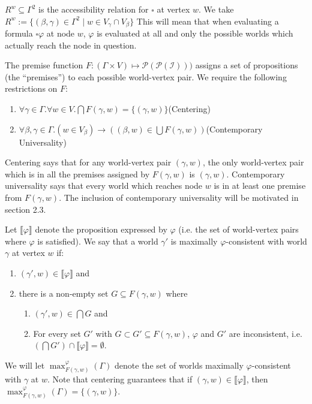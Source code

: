 \documentclass{article}
\begin{document}
$R^w\subseteq\Gamma^2$ is the accessibility relation for $\square$ at vertex $w$. We take $R^w :=\{(\beta,\gamma)\in\Gamma^2\mid w\in V_{\gamma}\cap V_{\beta}\}$ This will mean that when evaluating a formula $\square\varphi$ at node $w$, $\varphi$ is evaluated at all and only the possible worlds which actually reach the node in question.

The premise function $F:(\Gamma\times V)\longmapsto\mathcal P(\mathcal P(\mathcal I)))$ assigns a set of propositions (the ``premises'') to each possible world-vertex pair. We require the following restrictions on $F$:

\begin{enumerate}
    \item $\forall\gamma\in\Gamma.\forall w\in V.\bigcap F(\gamma,w)=\{(\gamma,w)\}$\quad(Centering)
    \item $\forall\beta,\gamma\in\Gamma.(w\in V_{\beta})\longrightarrow ((\beta,w)\in\bigcup F(\gamma,w))$\quad(Contemporary Universality)
\end{enumerate}
Centering says that for any world-vertex pair $(\gamma,w)$, the only world-vertex pair which is in all the premises assigned by $F(\gamma,w)$ is $(\gamma,w)$. Contemporary universality says that every world which reaches node $w$ is in at least one premise from $F(\gamma,w)$. The inclusion of contemporary universality will be motivated in section 2.3.

Let $\llbracket\varphi\rrbracket$ denote the proposition expressed by $\varphi$ (i.e. the set of world-vertex pairs where $\varphi$ is satisfied). We say that a world $\gamma'$ is maximally $\varphi$-consistent with world $\gamma$ at vertex $w$ if:
\begin{enumerate}
    \item $(\gamma',w)\in \llbracket\varphi\rrbracket$ and
    \item there is a non-empty set $G\subseteq F(\gamma,w)$ where
    \begin{enumerate}
        \item $(\gamma',w)\in\bigcap G$ and
        \item For every set $G'$ with $G\subset G'\subseteq F(\gamma,w)$, $\varphi$ and $G'$ are inconsistent, i.e. $(\bigcap G')\cap \llbracket\varphi\rrbracket = \emptyset$.
    \end{enumerate}
\end{enumerate}
We will let $\max_{F(\gamma,w)}^{\varphi}(\Gamma)$ denote the set of worlds maximally $\varphi$-consistent with $\gamma$ at $w$. Note that centering guarantees that if $(\gamma,w)\in\llbracket\varphi\rrbracket$, then $\max_{F(\gamma,w)}^{\varphi}(\Gamma)=\{(\gamma,w)\}$.
\end{document}
